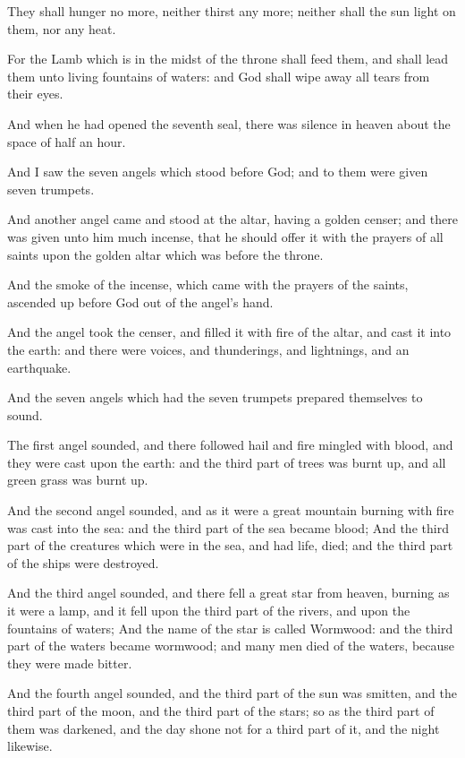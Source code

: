\Verse They shall hunger no more, neither thirst any more; neither shall the sun light on them, nor any heat.

\Verse For the Lamb which is in the midst of the throne shall feed them, and shall lead them unto living fountains of waters: and God shall wipe away all tears from their eyes.

\Chapter
\Verse And when he had opened the seventh seal, there was silence in heaven about the space of half an hour.

\Verse And I saw the seven angels which stood before God; and to them were given seven trumpets.

\Verse And another angel came and stood at the altar, having a golden censer; and there was given unto him much incense, that he should offer it with the prayers of all saints upon the golden altar which was before the throne.

\Verse And the smoke of the incense, which came with the prayers of the saints, ascended up before God out of the angel's hand.

\Verse And the angel took the censer, and filled it with fire of the altar, and cast it into the earth: and there were voices, and thunderings, and lightnings, and an earthquake.

\Verse And the seven angels which had the seven trumpets prepared themselves to sound.

\Verse The first angel sounded, and there followed hail and fire mingled with blood, and they were cast upon the earth: and the third part of trees was burnt up, and all green grass was burnt up.

\Verse And the second angel sounded, and as it were a great mountain burning with fire was cast into the sea: and the third part of the sea became blood; \Verse And the third part of the creatures which were in the sea, and had life, died; and the third part of the ships were destroyed.

\Verse And the third angel sounded, and there fell a great star from heaven, burning as it were a lamp, and it fell upon the third part of the rivers, and upon the fountains of waters; \Verse And the name of the star is called Wormwood: and the third part of the waters became wormwood; and many men died of the waters, because they were made bitter.

\Verse And the fourth angel sounded, and the third part of the sun was smitten, and the third part of the moon, and the third part of the stars; so as the third part of them was darkened, and the day shone not for a third part of it, and the night likewise.

